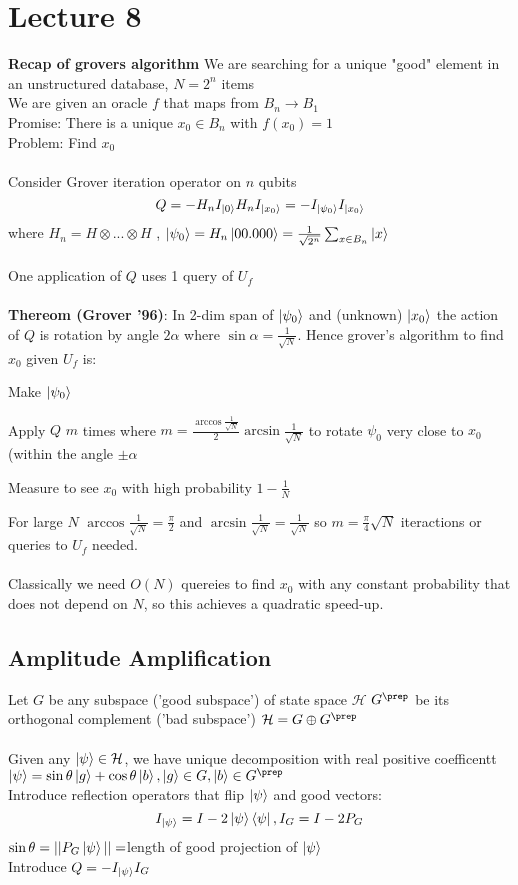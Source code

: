 \documentclass{article}
\begin{document}
{\section{Lecture 8}
\textbf{Recap of grovers algorithm}
We are searching for a unique "good" element in an unstructured database, $N= 2^n$ items\\
We are given an oracle $f$ that maps from $B_n \rightarrow B_1$\\
Promise: There is a unique $x_0 \in B_n$ with $f(x_0) = 1$\\
Problem: Find $x_0$\\\\
Consider Grover iteration operator on $n$ qubits
$$
Q = - H_n I_{\ket{0}} H_n I_{\ket{x_0}} = - I_{\ket{\psi_0}} I_{\ket{x_0}}
$$
where $H_n = H\otimes ... \otimes H$ , $\ket{\psi_0} = H_n \ket{00.000} = \frac{1}{\sqrt{2^n}} \sum_{x \in B_n} \ket{x}$\\\\
One application of $Q$ uses 1 query of $U_f$\\\\
\textbf{Thereom (Grover '96)}: In 2-dim span of $\ket{\psi_0}$ and (unknown) $\ket{x_0}$ the action of $Q$ is rotation by angle $2 \alpha$ where $\sin \alpha = \frac{1}{\sqrt{N}}$. Hence grover's algorithm to find $x_0$ given $U_f$ is:
\begin{itemlist}
\item Make $\ket{\psi_0}$\\
\item Apply $Q$ $m$ times where $m = \frac{\arccos \frac{1}{\sqrt{N}}}{2} \arcsin \frac{1}{\sqrt{N}}$ to rotate $\psi_0$ very close to $x_0$ (within the angle $\pm \alpha$\\
\item Measure to see $x_0$ with high probability $1- \frac{1}{N}$
\end{itemlist}
For large $N$ $\arccos \frac{1}{\sqrt{N}} = \frac{\pi}{2}$ and $\arcsin \frac{1}{\sqrt{N}} = \frac{1}{\sqrt{N}}$ so $m = \frac{\pi}{4} \sqrt{N}$ iteractions or queries to $U_f$ needed.\\\\
Classically we need $O(N)$ quereies to find $x_0$ with any constant probability that does not depend on $N$, so this achieves a quadratic speed-up.
\subsection{Amplitude Amplification}
Let $G$ be any subspace ('good subspace') of state space $\mathcal{H}$ $G^{\prep}$ be its orthogonal complement ('bad subspace') $\mathcal{H} = G \oplus G^{\prep}$\\\\
Given any $\ket{\psi} \in \mathcal{H}$, we have unique decomposition with real positive coefficentt $\ket{\psi} = \sin \theta \ket{g} + \cos \theta \ket{b}, \ket{g} \in G, \ket{b} \in G^{\prep}$\\
Introduce reflection operators that flip $\ket{\psi}$ and good vectors:
$$
I_{\ket{\psi}} = I - 2 \ket{\psi} \bra{\psi}, I_G = I - 2 P_G
$$
$\sin \theta  = ||P_G\ket{\psi}|| = $length of good projection of $\ket{\psi}$\\
Introduce $Q = -I_{\ket{\psi}} I_G$
}
\end{document}
